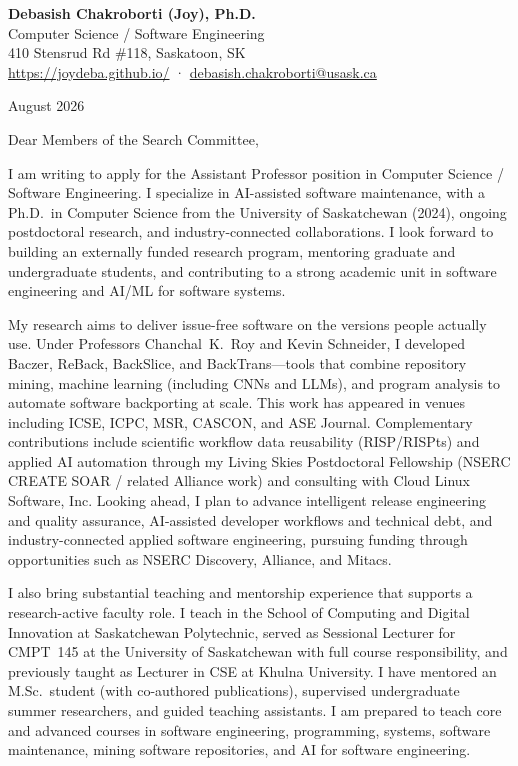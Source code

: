 \documentclass[10pt]{letter}
\begin{document}
\begin{center}
{\large\bfseries Debasish Chakroborti (Joy), Ph.D.}\\[0.2em]
Computer Science / Software Engineering\\
410 Stensrud Rd \#118, Saskatoon, SK\\
\href{https://joydeba.github.io/}{https://joydeba.github.io/} ·
\href{mailto:debasish.chakroborti@usask.ca}{debasish.chakroborti@usask.ca}
\end{center}

\vspace{0.3em}
\noindent August 2026

\vspace{0.2em}
\noindent Dear Members of the Search Committee,

I am writing to apply for the Assistant Professor position in Computer Science / Software Engineering. I specialize in AI-assisted software maintenance, with a Ph.D.\ in Computer Science from the University of Saskatchewan (2024), ongoing postdoctoral research, and industry-connected collaborations. I look forward to building an externally funded research program, mentoring graduate and undergraduate students, and contributing to a strong academic unit in software engineering and AI/ML for software systems.

My research aims to deliver issue-free software on the versions people actually use. Under Professors Chanchal~K.~Roy and Kevin Schneider, I developed Baczer, ReBack, BackSlice, and BackTrans---tools that combine repository mining, machine learning (including CNNs and LLMs), and program analysis to automate software backporting at scale. This work has appeared in venues including ICSE, ICPC, MSR, CASCON, and ASE Journal. Complementary contributions include scientific workflow data reusability (RISP/RISPts) and applied AI automation through my Living Skies Postdoctoral Fellowship (NSERC CREATE SOAR / related Alliance work) and consulting with Cloud Linux Software, Inc. Looking ahead, I plan to advance intelligent release engineering and quality assurance, AI-assisted developer workflows and technical debt, and industry-connected applied software engineering, pursuing funding through opportunities such as NSERC Discovery, Alliance, and Mitacs.

I also bring substantial teaching and mentorship experience that supports a research-active faculty role. I teach in the School of Computing and Digital Innovation at Saskatchewan Polytechnic, served as Sessional Lecturer for CMPT~145 at the University of Saskatchewan with full course responsibility, and previously taught as Lecturer in CSE at Khulna University. I have mentored an M.Sc.\ student (with co-authored publications), supervised undergraduate summer researchers, and guided teaching assistants. I am prepared to teach core and advanced courses in software engineering, programming, systems, software maintenance, mining software repositories, and AI for software engineering.
\end{document}
